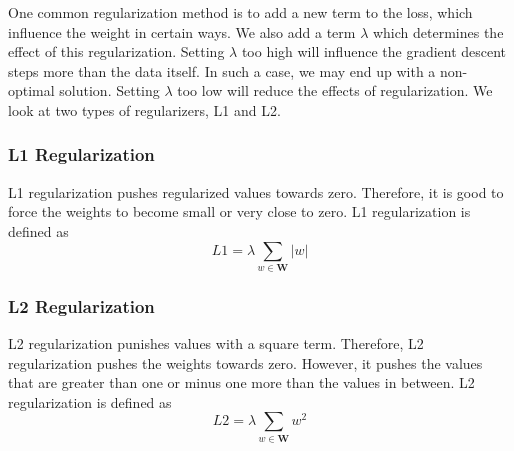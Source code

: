 One common regularization method is to add a new term to the loss, which influence the weight in certain ways. We also add a term $\lambda$ which determines the effect of this regularization. Setting $\lambda$ too high will influence the gradient descent steps more than the data itself. In such a case, we may end up with a non-optimal solution. Setting $\lambda$ too low will reduce the effects of regularization. We look at two types of regularizers, L1 and L2. 

\subsubsection{L1 Regularization}
L1 regularization pushes regularized values towards zero. Therefore, it is good to force the weights to become small or very close to zero. L1 regularization is defined as
$$ L1 = \lambda \sum_{w \in \mathbf{W}} |w| $$ 

\subsubsection{L2 Regularization}
L2 regularization punishes values with a square term. Therefore, L2 regularization pushes the weights towards zero. However, it pushes the values that are greater than one or minus one more than the values in between. L2 regularization is defined as
$$ L2 = \lambda \sum_{w \in \mathbf{W}} w^2 $$

\iffalse
